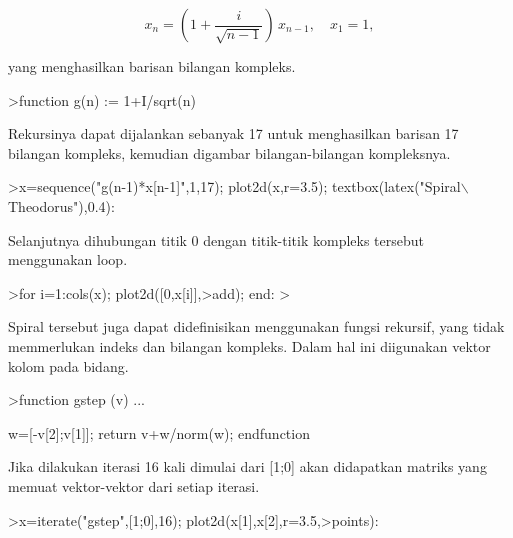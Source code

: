 \documentclass[a4paper,10pt]{article}
\begin{document}
\begin{eulernotebook}
\begin{eulercomment}
\begin{eulercomment}
\begin{eulercomment}
\end{eulercomment}
\begin{eulerformula}
\[
x_n = \left( 1 + \frac{i}{\sqrt{n-1}} \right) \, x_{n-1}, \quad x_1=1,
\]
\end{eulerformula}
\begin{eulercomment}
yang menghasilkan barisan bilangan kompleks.
\end{eulercomment}
\begin{eulerprompt}
>function g(n) := 1+I/sqrt(n)
\end{eulerprompt}
\begin{eulercomment}
Rekursinya dapat dijalankan sebanyak 17 untuk menghasilkan barisan 17 bilangan kompleks,
kemudian digambar bilangan-bilangan kompleksnya.
\end{eulercomment}
\begin{eulerprompt}
>x=sequence("g(n-1)*x[n-1]",1,17); plot2d(x,r=3.5); textbox(latex("Spiral\(\backslash\) Theodorus"),0.4):
\end{eulerprompt}
\begin{eulercomment}
Selanjutnya dihubungan titik 0 dengan titik-titik kompleks tersebut menggunakan loop.
\end{eulercomment}
\begin{eulerprompt}
>for i=1:cols(x); plot2d([0,x[i]],>add); end:
> 
\end{eulerprompt}
\begin{eulercomment}
Spiral tersebut juga dapat didefinisikan menggunakan fungsi rekursif, yang tidak memmerlukan
indeks dan bilangan kompleks. Dalam hal ini diigunakan vektor kolom pada bidang.
\end{eulercomment}
\begin{eulerprompt}
>function gstep (v) ...
\end{eulerprompt}
\begin{eulerudf}
  w=[-v[2];v[1]];
  return v+w/norm(w);
  endfunction
\end{eulerudf}
\begin{eulercomment}
Jika dilakukan iterasi 16 kali dimulai dari [1;0] akan didapatkan matriks yang memuat
vektor-vektor dari setiap iterasi.
\end{eulercomment}
\begin{eulerprompt}
>x=iterate("gstep",[1;0],16); plot2d(x[1],x[2],r=3.5,>points):
\end{eulerprompt}
\begin{eulercomment}
\begin{eulercomment}
\begin{eulercomment}

\end{eulercomment}
\end{eulercomment}
\end{eulercomment}
\end{eulercomment}
\end{eulercomment}
\end{eulernotebook}
\end{document}
